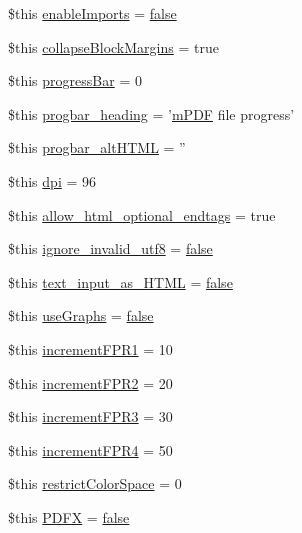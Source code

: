 \begin{DoxyCompactItemize}
\item 
\$this \hyperlink{config_8php_ad7ba429e10a7606fa2c5f25849d5f3ea}{enable\-Imports} = \hyperlink{ttfontsuni_8php_afbaa04e5cc97693dc668b3c45d3dd740}{false}
\item 
\$this \hyperlink{config_8php_a0879eb8787af90206e98406c05413f17}{collapse\-Block\-Margins} = true
\item 
\$this \hyperlink{config_8php_a95308f164277947b7b95abd2e6c5f6ee}{progress\-Bar} = 0
\item 
\$this \hyperlink{config_8php_a57aaaa91906b971f09182e61642d74fe}{progbar\-\_\-heading} = '\hyperlink{classm_p_d_f}{m\-P\-D\-F} file progress'
\item 
\$this \hyperlink{config_8php_a57e965ae11e0915345d997eba69b6f35}{progbar\-\_\-alt\-H\-T\-M\-L} = ''
\item 
\$this \hyperlink{config_8php_ab7ce7dd9fef2e7d36bc3da8e0974a06e}{dpi} = 96
\item 
\$this \hyperlink{config_8php_a0c175fde7f6392aaa72e9cf5d933cf5b}{allow\-\_\-html\-\_\-optional\-\_\-endtags} = true
\item 
\$this \hyperlink{config_8php_a17ac742a18198cf70eed0b6b0c2a710a}{ignore\-\_\-invalid\-\_\-utf8} = \hyperlink{ttfontsuni_8php_afbaa04e5cc97693dc668b3c45d3dd740}{false}
\item 
\$this \hyperlink{config_8php_ae916c1d351fdd8ebe360627f23169972}{text\-\_\-input\-\_\-as\-\_\-\-H\-T\-M\-L} = \hyperlink{ttfontsuni_8php_afbaa04e5cc97693dc668b3c45d3dd740}{false}
\item 
\$this \hyperlink{config_8php_a881f1e9a5472904db96657e5c78b570e}{use\-Graphs} = \hyperlink{ttfontsuni_8php_afbaa04e5cc97693dc668b3c45d3dd740}{false}
\item 
\$this \hyperlink{config_8php_ab5eb8661b7d2890c798e8d6d9f47944e}{increment\-F\-P\-R1} = 10
\item 
\$this \hyperlink{config_8php_a071e4f33e2427747f1e558624497e7bf}{increment\-F\-P\-R2} = 20
\item 
\$this \hyperlink{config_8php_ad740a5db9735ccb22f53324dbfe121fb}{increment\-F\-P\-R3} = 30
\item 
\$this \hyperlink{config_8php_a732a97aab2478ad0cd6bfac82d99e785}{increment\-F\-P\-R4} = 50
\item 
\$this \hyperlink{config_8php_aa14b0c5efe07e147eee3cf1d8c269c32}{restrict\-Color\-Space} = 0
\item 
\$this \hyperlink{config_8php_a04cdb2cc946d7bd0b29f90d6e507a4a4}{P\-D\-F\-X} = \hyperlink{ttfontsuni_8php_afbaa04e5cc97693dc668b3c45d3dd740}{false}

\end{DoxyCompactItemize}

